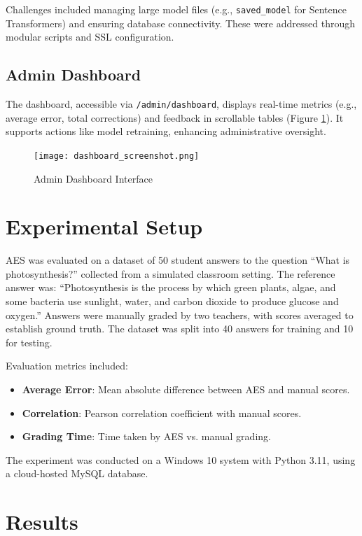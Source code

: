 \documentclass[conference]{IEEEtran}
\begin{document}
Challenges included managing large model files (e.g., \texttt{saved\_model} for Sentence Transformers) and ensuring database connectivity. These were addressed through modular scripts and SSL configuration.

\subsection{Admin Dashboard}
The dashboard, accessible via \texttt{/admin/dashboard}, displays real-time metrics (e.g., average error, total corrections) and feedback in scrollable tables (Figure \ref{fig:dashboard}). It supports actions like model retraining, enhancing administrative oversight.

\begin{figure}[h]
    \centering
    \texttt{[image: dashboard\_screenshot.png]}
    \caption{Admin Dashboard Interface}
    \label{fig:dashboard}
\end{figure}

\section{Experimental Setup}
AES was evaluated on a dataset of 50 student answers to the question ``What is photosynthesis?'' collected from a simulated classroom setting. The reference answer was: ``Photosynthesis is the process by which green plants, algae, and some bacteria use sunlight, water, and carbon dioxide to produce glucose and oxygen.'' Answers were manually graded by two teachers, with scores averaged to establish ground truth. The dataset was split into 40 answers for training and 10 for testing.

Evaluation metrics included:
\begin{itemize}
    \item \textbf{Average Error}: Mean absolute difference between AES and manual scores.
    \item \textbf{Correlation}: Pearson correlation coefficient with manual scores.
    \item \textbf{Grading Time}: Time taken by AES vs. manual grading.
\end{itemize}

The experiment was conducted on a Windows 10 system with Python 3.11, using a cloud-hosted MySQL database.

\section{Results}
\end{document}
